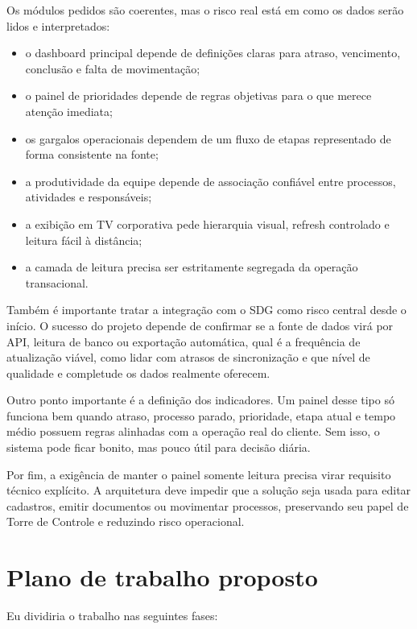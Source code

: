 \documentclass[11pt,a4paper]{article}
\begin{document}
Os módulos pedidos são coerentes, mas o risco real está em como os dados serão lidos e interpretados:

\begin{itemize}
\item o dashboard principal depende de definições claras para atraso, vencimento, conclusão e falta de movimentação;
\item o painel de prioridades depende de regras objetivas para o que merece atenção imediata;
\item os gargalos operacionais dependem de um fluxo de etapas representado de forma consistente na fonte;
\item a produtividade da equipe depende de associação confiável entre processos, atividades e responsáveis;
\item a exibição em TV corporativa pede hierarquia visual, refresh controlado e leitura fácil à distância;
\item a camada de leitura precisa ser estritamente segregada da operação transacional.
\end{itemize}

Também é importante tratar a integração com o SDG como risco central desde o início. O sucesso do projeto depende de confirmar se a fonte de dados virá por API, leitura de banco ou exportação automática, qual é a frequência de atualização viável, como lidar com atrasos de sincronização e que nível de qualidade e completude os dados realmente oferecem.\par

Outro ponto importante é a definição dos indicadores. Um painel desse tipo só funciona bem quando atraso, processo parado, prioridade, etapa atual e tempo médio possuem regras alinhadas com a operação real do cliente. Sem isso, o sistema pode ficar bonito, mas pouco útil para decisão diária.\par

Por fim, a exigência de manter o painel somente leitura precisa virar requisito técnico explícito. A arquitetura deve impedir que a solução seja usada para editar cadastros, emitir documentos ou movimentar processos, preservando seu papel de Torre de Controle e reduzindo risco operacional.\par

\section*{Plano de trabalho proposto}

Eu dividiria o trabalho nas seguintes fases:\par
\end{document}
